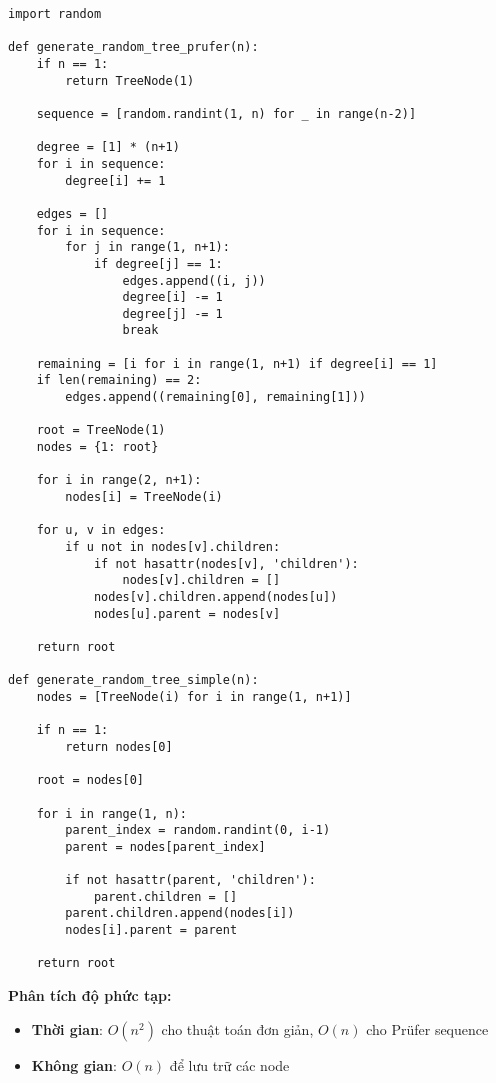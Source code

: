 \documentclass[12pt]{article}
\begin{document}
\begin{lstlisting}
import random

def generate_random_tree_prufer(n):
    if n == 1:
        return TreeNode(1)
    
    sequence = [random.randint(1, n) for _ in range(n-2)]
    
    degree = [1] * (n+1)
    for i in sequence:
        degree[i] += 1
    
    edges = []
    for i in sequence:
        for j in range(1, n+1):
            if degree[j] == 1:
                edges.append((i, j))
                degree[i] -= 1
                degree[j] -= 1
                break
    
    remaining = [i for i in range(1, n+1) if degree[i] == 1]
    if len(remaining) == 2:
        edges.append((remaining[0], remaining[1]))
    
    root = TreeNode(1)
    nodes = {1: root}
    
    for i in range(2, n+1):
        nodes[i] = TreeNode(i)
    
    for u, v in edges:
        if u not in nodes[v].children:
            if not hasattr(nodes[v], 'children'):
                nodes[v].children = []
            nodes[v].children.append(nodes[u])
            nodes[u].parent = nodes[v]
    
    return root

def generate_random_tree_simple(n):
    nodes = [TreeNode(i) for i in range(1, n+1)]
    
    if n == 1:
        return nodes[0]
    
    root = nodes[0]
    
    for i in range(1, n):
        parent_index = random.randint(0, i-1)
        parent = nodes[parent_index]
        
        if not hasattr(parent, 'children'):
            parent.children = []
        parent.children.append(nodes[i])
        nodes[i].parent = parent
    
    return root
\end{lstlisting}

\textbf{Phân tích độ phức tạp:}
\begin{itemize}
    \item \textbf{Thời gian}: $O(n^2)$ cho thuật toán đơn giản, $O(n)$ cho Prüfer sequence
    \item \textbf{Không gian}: $O(n)$ để lưu trữ các node
\end{itemize}
\end{document}
